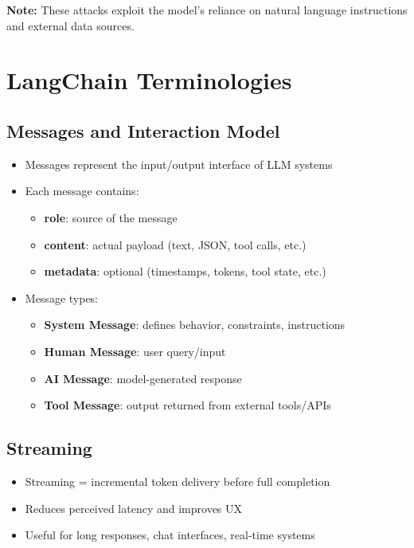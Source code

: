 \documentclass[10pt,a4paper]{article}
\begin{document}
\bigskip
\textbf{Note:} These attacks exploit the model's reliance on natural language instructions and external data sources.


\section{LangChain Terminologies}
\subsection{Messages and Interaction Model}

\begin{itemize}
\item Messages represent the input/output interface of LLM systems
\item Each message contains:
  \begin{itemize}
    \item \textbf{role}: source of the message
    \item \textbf{content}: actual payload (text, JSON, tool calls, etc.)
    \item \textbf{metadata}: optional (timestamps, tokens, tool state, etc.)
  \end{itemize}


\item Message types:
\begin{itemize}
\item \textbf{System Message}: defines behavior, constraints, instructions
\item \textbf{Human Message}: user query/input
\item \textbf{AI Message}: model-generated response
\item \textbf{Tool Message}: output returned from external tools/APIs
\end{itemize}

\end{itemize}


\vspace{0.5em}
\noindent
\subsection{Streaming}

\begin{itemize}
\item Streaming = incremental token delivery before full completion
\item Reduces perceived latency and improves UX
\item Useful for long responses, chat interfaces, real-time systems
\end{itemize}
\end{document}
